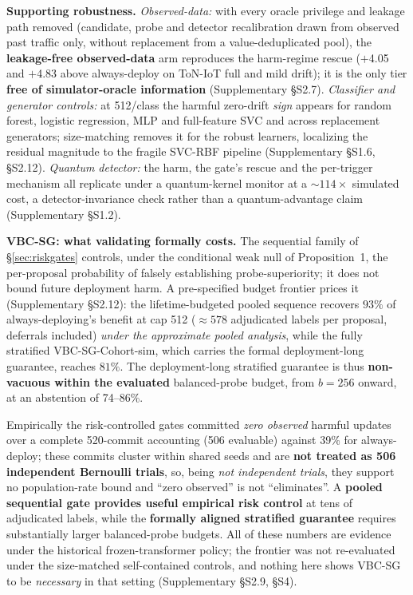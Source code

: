 \documentclass[a4paper,fleqn]{cas-sc}
\begin{document}
\textbf{Supporting robustness.} \emph{Observed-data:} with every oracle privilege and leakage path removed (candidate, probe and detector recalibration drawn from observed past traffic only, without replacement from a value-deduplicated pool), the \textbf{leakage-free observed-data} arm reproduces the harm-regime rescue ($+$4.05 and $+$4.83 above always-deploy on ToN-IoT full and mild drift); it is the only tier \textbf{free of simulator-oracle information} (Supplementary \S S2.7). \emph{Classifier and generator controls:} at 512/class the harmful zero-drift \emph{sign} appears for random forest, logistic regression, MLP and full-feature SVC and across replacement generators; size-matching removes it for the robust learners, localizing the residual magnitude to the fragile SVC-RBF pipeline (Supplementary \S S1.6, \S S2.12). \emph{Quantum detector:} the harm, the gate's rescue and the per-trigger mechanism all replicate under a quantum-kernel monitor at a ${\sim}114\times$ simulated cost, a detector-invariance check rather than a quantum-advantage claim (Supplementary \S S1.2).

\textbf{VBC-SG: what validating formally costs.} The sequential family of \S\ref{sec:riskgates} controls, under the conditional weak null of Proposition~1, the per-proposal probability of falsely establishing probe-superiority; it does not bound future deployment harm. A pre-specified budget frontier prices it (Supplementary \S S2.12): the lifetime-budgeted pooled sequence recovers $93\%$ of always-deploying's benefit at cap 512 (${\approx}578$ adjudicated labels per proposal, deferrals included) \emph{under the approximate pooled analysis}, while the fully stratified VBC-SG-Cohort-sim, which carries the formal deployment-long guarantee, reaches $81\%$. The deployment-long stratified guarantee is thus \textbf{non-vacuous within the evaluated} balanced-probe budget, from $b{=}256$ onward, at an abstention of 74--86\%.

Empirically the risk-controlled gates committed \emph{zero observed} harmful updates over a complete 520-commit accounting (506 evaluable) against 39\% for always-deploy; these commits cluster within shared seeds and are \textbf{not treated as 506 independent Bernoulli trials}, so, being \emph{not independent trials}, they support no population-rate bound and ``zero observed'' is not ``eliminates''. A \textbf{pooled sequential gate provides useful empirical risk control} at tens of adjudicated labels, while the \textbf{formally aligned stratified guarantee} requires substantially larger balanced-probe budgets. All of these numbers are evidence under the historical frozen-transformer policy; the frontier was not re-evaluated under the size-matched self-contained controls, and nothing here shows VBC-SG to be \emph{necessary} in that setting (Supplementary \S S2.9, \S S4).
\end{document}
